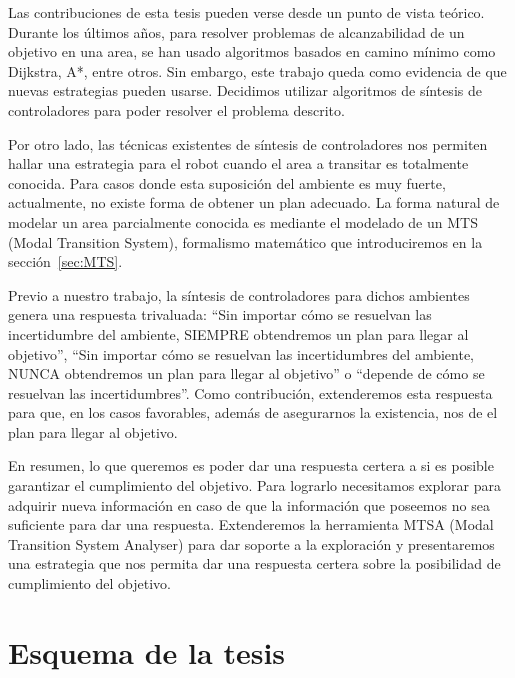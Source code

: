 Las contribuciones de esta tesis pueden verse desde un punto de vista teórico. 
Durante los últimos años, para resolver problemas de alcanzabilidad de un 
objetivo en una area, se han usado algoritmos basados en camino mínimo como 
Dijkstra, A*, entre otros. Sin embargo, este trabajo queda como evidencia de 
que nuevas estrategias pueden usarse. Decidimos utilizar algoritmos de síntesis 
de controladores para poder resolver el problema descrito.

Por otro lado, las técnicas existentes de síntesis de controladores nos 
permiten hallar una estrategia para el robot cuando el area a transitar es 
totalmente conocida. Para casos donde esta suposición del ambiente es muy 
fuerte, actualmente, no existe forma de obtener un plan adecuado. La forma 
natural de modelar un area parcialmente conocida es mediante el modelado de un 
MTS (Modal Transition System), formalismo matemático que introduciremos en la 
sección~\ref{sec:MTS}. 

Previo a nuestro trabajo, la síntesis de controladores para dichos ambientes 
genera una respuesta trivaluada: ``Sin importar cómo se resuelvan las 
incertidumbre del ambiente, SIEMPRE obtendremos un plan para llegar al 
objetivo'', ``Sin importar cómo se resuelvan las incertidumbres del ambiente, 
NUNCA obtendremos un plan para llegar al objetivo'' o ``depende de cómo se 
resuelvan las incertidumbres''. Como contribución, extenderemos esta respuesta 
para que, en los casos favorables, además de asegurarnos la existencia, nos de 
el plan para llegar al objetivo.

En resumen, lo que queremos es poder dar una respuesta certera a si es posible 
garantizar 
el cumplimiento del objetivo. 
Para lograrlo necesitamos explorar para adquirir nueva información en caso de 
que la información que poseemos no sea 
suficiente para dar una respuesta. Extenderemos la herramienta MTSA (Modal 
Transition System Analyser) para dar soporte 
a la exploración y presentaremos una estrategia que nos permita dar una 
respuesta certera sobre la posibilidad de 
cumplimiento del objetivo.


\section{Esquema de la tesis}

